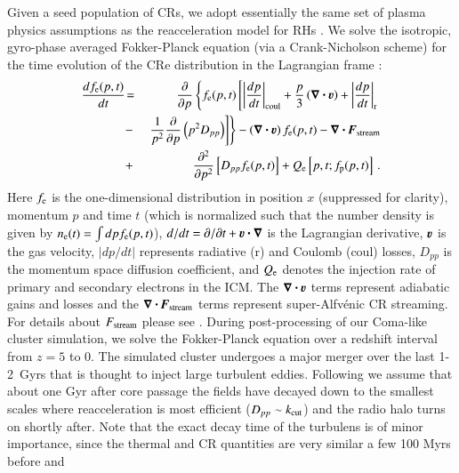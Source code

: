 \documentclass[a4paper,fleqn,usenatbib]{mnras}
\newcommand{\bcdot}{\ensuremath{%
  \mathchoice%
   {\mskip\thinmuskip\lower0.2ex\hbox{\scalebox{1.5}{$\cdot$}}\mskip\thinmuskip}}%
   {\mskip\thinmuskip\lower0.2ex\hbox{\scalebox{1.5}{$\cdot$}}\mskip\thinmuskip}%
   {\lower0.3ex\hbox{\scalebox{1.2}{$\cdot$}}}%
   {\lower0.3ex\hbox{\scalebox{1.2}{$\cdot$}}}%
}
\renewcommand{\vec}{\ensuremath{\mathbfit}}
\newcommand{\bvel}{\ensuremath{\boldsymbol{\varv}}}
\newcommand{\bnabla}{\ensuremath{\boldsymbol{\nabla}}}
\begin{document}
Given a seed population of CRs, we adopt essentially the same set of
plasma physics assumptions as the reacceleration model for RHs
\citep{brunetti07,brunetti11}. We solve the isotropic, gyro-phase
averaged Fokker-Planck equation (via a Crank-Nicholson scheme) for the
time evolution of the CRe distribution in the Lagrangian frame
\citep{brunetti07,brunetti11}:
\begin{eqnarray}
{{d f_{\rmn{e}}(p,t)}\over{d t}} &\!=&
\frac{\partial}{\partial p}
\left\{
f_{\rmn{e}}(p,t)\left[
\left|{{dp}\over{dt}}\right|_{\rm coul} 
+ \frac{p}{3}\left(\bnabla\bcdot \bvel\right)
+ \left|{{dp}\over{dt}}\right|_{\rm r}\right.\right.
\nonumber\\
&-& \left.\left.{1\over{p^2}}{{\partial }\over{\partial p}}\left(p^2 D_{pp}\right) 
\right]\right\} - \left(\bnabla\bcdot \bvel\right) f_{\rmn{e}}(p,t)
- \bnabla\bcdot \vec{F}_\rmn{stream}
\nonumber\\
&+& {{\partial^2 }\over{\partial p^2}}
\left[
D_{pp} f_{\rmn{e}}(p,t) \right]+ Q_{\rmn{e}}\left[p,t;f_{\rmn{p}}(p,t)\right]   \, .
\label{elettroni}
\end{eqnarray}
Here $f_{{\mathrm{e}}}$ is the one-dimensional distribution in position $x$
(suppressed for clarity), momentum $p$ and time $t$ (which is
normalized such that the number density is given by
$n_{{\mathrm{e}}}(t)=\int d p f_{{\mathrm{e}}}(p,t)$), $d/dt=\partial/\partial
t+\bvel\bcdot\bnabla$ is the Lagrangian derivative, $\bvel$ is the gas
velocity, $|dp/dt|$ represents radiative (r) and Coulomb (coul) losses,
$D_{pp}$ is the momentum space diffusion coefficient, and
$Q_{{\mathrm{e}}}$ denotes the injection rate of primary and secondary
electrons in the ICM. The $\bnabla\bcdot \bvel$ terms represent
adiabatic gains and losses and the $\bnabla\bcdot
\vec{F}_\rmn{stream}$ terms represent super-Alfv{\'e}nic CR
streaming. For details about $F_{\mathrm{stream}}$ please see
\citet{wiener13}. During post-processing of our Coma-like cluster
simulation, we solve the Fokker-Planck equation over a redshift
interval from $z=5$ to 0. The simulated cluster undergoes a major
merger over the last 1-2~Gyrs that is thought to inject large
turbulent eddies. Following \citet{brunetti07,brunetti11} \citep[see
  also][]{2004ApJ...614..757Y,2015ApJ...800...60M} we assume that
about one Gyr after core passage the fields have decayed down to the
smallest scales where reacceleration is most efficient ($D_{pp}\sim
k_{\mathrm{cut}}$) and the radio halo turns on shortly after. Note that the
exact decay time of the turbulens is of minor importance, since the
thermal and CR quantities are very similar a few 100 Myrs before and
\end{document}
